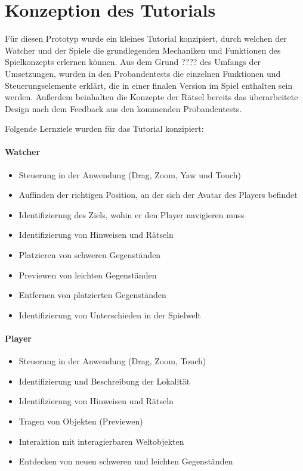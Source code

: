 \section{Konzeption des Tutorials}

Für diesen Prototyp wurde ein kleines Tutorial konzipiert, durch welchen der Watcher und der Spiele die grundlegenden Mechaniken und Funktionen des Spielkonzepts erlernen können. Aus dem Grund ???? des Umfangs der Umsetzungen, wurden in den Probandentests die einzelnen Funktionen und Steuerungselemente erklärt, die in einer finalen Version im Spiel enthalten sein werden. Außerdem beinhalten die Konzepte der Rätsel bereits das überarbeitete Design nach dem Feedback aus den kommenden Probandentests.

Folgende Lernziele wurden für das Tutorial konzipiert:
\paragraph{Watcher}
\begin{itemize}
    \item Steuerung in der Anwendung (Drag, Zoom, Yaw und Touch)
    \item Auffinden der richtigen Position, an der sich der Avatar des Players befindet 
    \item Identifizierung des Ziels, wohin er den Player navigieren muss
    \item Identifizierung von Hinweisen und Rätseln
    \item Platzieren von schweren Gegenständen
    \item Previewen von leichten Gegenständen
    \item Entfernen von platzierten Gegenständen
    \item Identifizierung von Unterschieden in der Spielwelt
\end{itemize}

\paragraph{Player}

\begin{itemize}
    \item Steuerung in der Anwendung (Drag, Zoom, Touch)
    \item Identifizierung und Beschreibung der Lokalität
    \item Identifizierung von Hinweisen und Rätseln
    \item Tragen von Objekten (Previewen)
    \item Interaktion mit interagierbaren Weltobjekten
    \item Entdecken von neuen schweren und leichten Gegenständen
\end{itemize}

